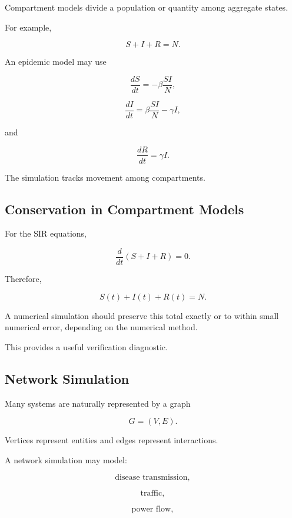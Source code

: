Compartment models divide a population or quantity among aggregate states.

For example,

\[
\boxed{
S+I+R=N.
}
\]

An epidemic model may use

\[
\boxed{
\frac{dS}{dt}
=
-\beta
\frac{SI}{N},
}
\]

\[
\boxed{
\frac{dI}{dt}
=
\beta
\frac{SI}{N}
-
\gamma I,
}
\]

and

\[
\boxed{
\frac{dR}{dt}
=
\gamma I.
}
\]

The simulation tracks movement among compartments.

\subsection{Conservation in Compartment Models}
\label{subsec:compartment-conservation}

For the SIR equations,

\[
\frac{d}{dt}
(S+I+R)
=
0.
\]

Therefore,

\[
\boxed{
S(t)+I(t)+R(t)=N.
}
\]

A numerical simulation should preserve this total exactly or to within
small numerical error, depending on the numerical method.

This provides a useful verification diagnostic.

\subsection{Network Simulation}
\label{subsec:network-simulation}

Many systems are naturally represented by a graph

\[
\boxed{
G=(V,E).
}
\]

Vertices represent entities and edges represent interactions.

A network simulation may model:

\[
\boxed{
\text{disease transmission},
}
\]

\[
\boxed{
\text{traffic},
}
\]

\[
\boxed{
\text{power flow},
}
\]


